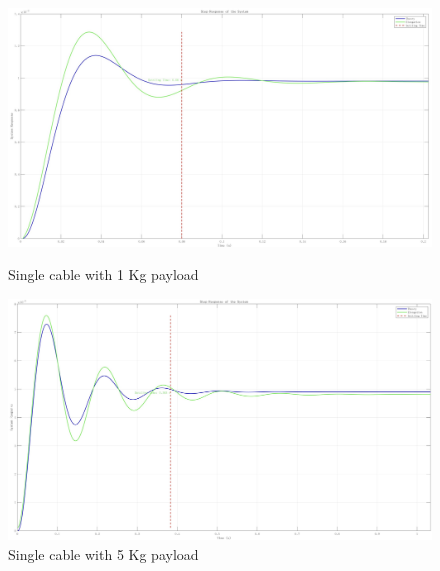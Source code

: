 \documentclass[12pt,twoside,letterpaper]{article}
\begin{document}
\begin{figure}[H]
    \vspace{0.5cm}

    \begin{minipage}{0.49\textwidth}
        \centering
        \includegraphics[width=\linewidth]{figures/1s.jpg}
        \caption{Single cable with 1 Kg payload}
        \label{fig:case3}
    \end{minipage}
    \hfill
    \begin{minipage}{0.49\textwidth}
        \centering
        \includegraphics[width=\linewidth]{figures/5s.jpg}
        \caption{Single cable with 5 Kg payload}
        \label{fig:case4}
    \end{minipage}
\end{figure}
\end{document}
